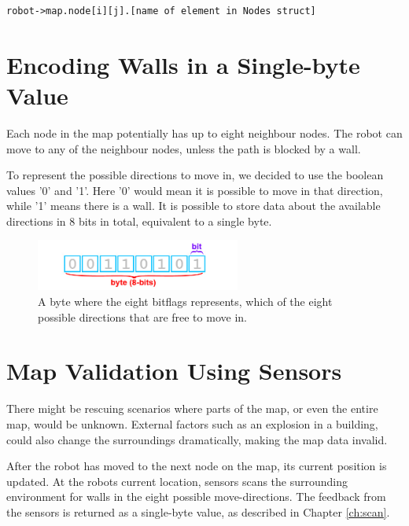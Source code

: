 {\begin{lstlisting}[caption={Example of accessing a node in the node map stored in a 2D array in {\tt map.c}},label={lst:AccessingNode}]
robot->map.node[i][j].[name of element in Nodes struct]
\end{lstlisting}

\section{Encoding Walls in a Single-byte Value}
\label{sec:map_hex}
Each node in the map potentially has up to eight neighbour nodes. 
The robot can move to any of the neighbour nodes, unless the path is blocked by a wall.

To represent the possible directions to move in, we decided to use the boolean values '0' and '1'. 
Here '0' would mean it is possible to move in that direction, while '1' means there is a wall.
It is possible to store data about the available directions in 8 bits in total, equivalent to a single byte.

\begin{figure}[htp]
    \centering
        \includegraphics[width=0.60\textwidth]{figures/map/bitbyte.png}%
    \caption{A byte where the eight bitflags represents, which of the eight possible directions that are free to move in.}
    \label{fig:bitbyte}
\end{figure}

\section{Map Validation Using Sensors}
\label{sec:map_check} %
There might be rescuing scenarios where parts of the map, or even the entire map, would be unknown.
External factors such as an explosion in a building, could also change the surroundings dramatically, making the map data invalid.

After the robot has moved to the next node on the map, its current position is updated.
At the robots current location, sensors scans the surrounding environment for walls in the eight possible move-directions.
The feedback from the sensors is returned as a single-byte value, as described in Chapter \ref{ch:scan}.

}
